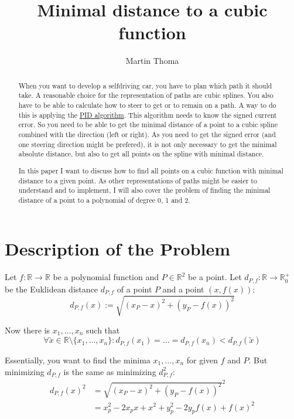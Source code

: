 \documentclass[a4paper]{scrartcl}
\title{Minimal distance to a cubic function}
\author{Martin Thoma}
\theoremstyle{break}
\theoremstyle{nonumberplain}
\def\mdr{\ensuremath{\mathbb{R}}}
\begin{document}
\maketitle
\begin{abstract}
When you want to develop a selfdriving car, you have to plan which path 
it should take. A reasonable choice for the representation of
paths are cubic splines. You also have to be able to calculate
how to steer to get or to remain on a path. A way to do this
is applying the \href{https://en.wikipedia.org/wiki/PID_algorithm}{PID algorithm}.
This algorithm needs to know the signed current error. So you need to 
be able to get the minimal distance of a point to a cubic spline combined with the direction (left or right).
As you need to get the signed error (and one steering direction might
be prefered), it is not only necessary to
get the minimal absolute distance, but also to get all points
on the spline with minimal distance.

In this paper I want to discuss how to find all points on a cubic 
function with minimal distance to a given point.
As other representations of paths might be easier to understand and
to implement, I will also cover the problem of finding the minimal
distance of a point to a polynomial of degree 0, 1 and 2.
\end{abstract}

\section{Description of the Problem}
Let $f: \mdr \rightarrow \mdr$ be a polynomial function and $P \in \mdr^2$
be a point. Let $d_{P,f}: \mdr \rightarrow \mdr_0^+$
be the Euklidean distance $d_{P,f}$ of a point $P$ and a point $\left (x, f(x) \right )$:
\[d_{P,f} (x) := \sqrt{(x_P - x)^2 + (y_P - f(x))^2}\]

Now there is  $x_1, \dots, x_n$ such that 
\[\forall \tilde x \in \mathbb{R} \setminus \{x_1, \dots, x_n\}: d_{P,f}(x_1) = \dots = d_{P,f}(x_n) < d_{P,f}(\tilde x)\]

Essentially, you want to find the minima $x_1, \dots, x_n$ for given 
$f$ and $P$.
But minimizing $d_{P,f}$ is the same as minimizing $d_{P,f}^2$:
\begin{align}
    d_{P,f}(x)^2    &= \sqrt{(x_P - x)^2 + (y_P - f(x))^2}^2\\
                &= x_p^2 - 2x_p x + x^2 + y_p^2 - 2y_p f(x) + f(x)^2
\end{align}
\end{document}
